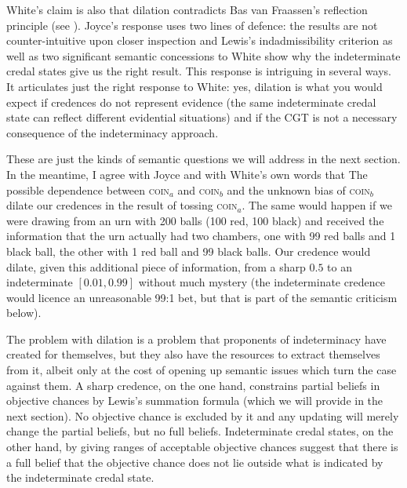 White's claim is also that dilation contradicts Bas van Fraassen's reflection principle (see ). Joyce's response uses two lines of defence: the results are not counter-intuitive upon closer inspection and Lewis's indadmissibility criterion as well as two significant semantic concessions to White show why the indeterminate credal states give us the right result. This response is intriguing in several ways. It articulates just the right response to White: yes, dilation is what you would expect if credences do not represent evidence (the same indeterminate credal state can reflect different evidential situations) and if the CGT is not a necessary consequence of the indeterminacy approach.

These are just the kinds of semantic questions we will address in the next section. In the meantime, I agree with Joyce and with White's own words that  The possible dependence between \textsc{coin}$_{a}$ and \textsc{coin}$_{b}$ and the unknown bias of \textsc{coin}$_{b}$ dilate our credences in the result of tossing \textsc{coin}$_{a}$. The same would happen if we were drawing from an urn with 200 balls (100 red, 100 black) and received the information that the urn actually had two chambers, one with 99 red balls and 1 black ball, the other with 1 red ball and 99 black balls. Our credence would dilate, given this additional piece of information, from a sharp $0.5$ to an indeterminate $[0.01,0.99]$ without much mystery (the indeterminate credence would licence an unreasonable 99:1 bet, but that is part of the semantic criticism below).

The problem with dilation is a problem that proponents of indeterminacy have created for themselves, but they also have the resources to extract themselves from it, albeit only at the cost of opening up semantic issues which turn the case against them. A sharp credence, on the one hand, constrains partial beliefs in objective chances by Lewis's summation formula (which we will provide in the next section). No objective chance is excluded by it and any updating will merely change the partial beliefs, but no full beliefs. Indeterminate credal states, on the other hand, by giving ranges of acceptable objective chances suggest that there is a full belief that the objective chance does not lie outside what is indicated by the indeterminate credal state.

